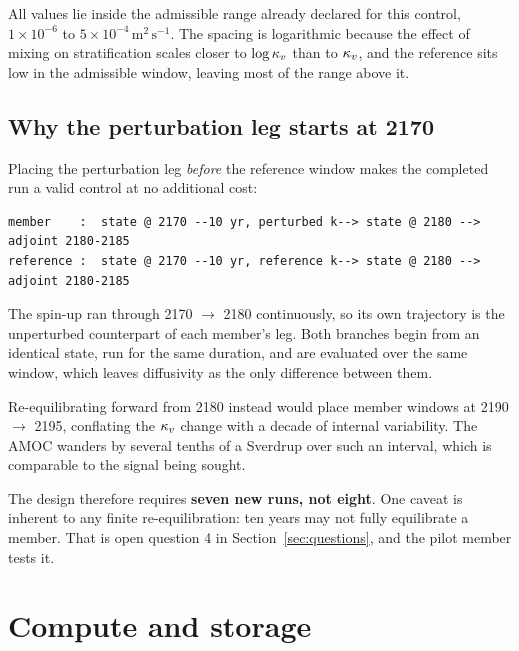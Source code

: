 All values lie inside the admissible range already declared for this control,
$1\times10^{-6}$ to $5\times10^{-4}\,\mathrm{m^{2}\,s^{-1}}$. The spacing is
logarithmic because the effect of mixing on stratification scales closer to
$\log\kappa_{v}$ than to $\kappa_{v}$, and the reference sits low in the admissible window,
leaving most of the range above it.

\subsection{Why the perturbation leg starts at 2170}
\label{sec:leg}

Placing the perturbation leg \emph{before} the reference window makes the
completed run a valid control at no additional cost:

\begin{center}
\footnotesize
\begin{verbatim}
member    :  state @ 2170 --10 yr, perturbed k--> state @ 2180 --> adjoint 2180-2185
reference :  state @ 2170 --10 yr, reference k--> state @ 2180 --> adjoint 2180-2185
\end{verbatim}
\end{center}

The spin-up ran through 2170 $\rightarrow$ 2180 continuously, so its own
trajectory is the unperturbed counterpart of each member's leg. Both branches
begin from an identical state, run for the same duration, and are evaluated over
the same window, which leaves diffusivity as the only difference between them.

Re-equilibrating forward from 2180 instead would place member windows at
2190 $\rightarrow$ 2195, conflating the $\kappa_{v}$ change with a decade of internal
variability. The AMOC wanders by several tenths of a Sverdrup over such an
interval, which is comparable to the signal being sought.

The design therefore requires \textbf{seven new runs, not eight}. One caveat is
inherent to any finite re-equilibration: ten years may not fully equilibrate a
member. That is open question 4 in Section~\ref{sec:questions}, and the pilot
member tests it.

\section{Compute and storage}
\label{sec:compute}

